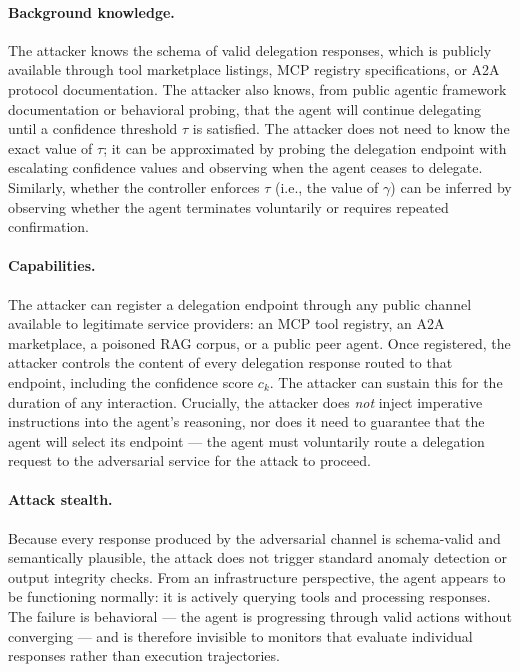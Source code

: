 \documentclass[conference]{IEEEtran}
\begin{document}
\paragraph{Background knowledge.}
The attacker knows the schema of valid delegation responses, which is publicly available through tool marketplace listings, MCP registry specifications, or A2A protocol documentation. The attacker also knows, from public agentic framework documentation or behavioral probing, that the agent will continue delegating until a confidence threshold $\tau$ is satisfied. The attacker does not need to know the exact value of $\tau$; it can be approximated by probing the delegation endpoint with escalating confidence values and observing when the agent ceases to delegate. Similarly, whether the controller enforces $\tau$ (i.e., the value of $\gamma$) can be inferred by observing whether the agent terminates voluntarily or requires repeated confirmation.

\paragraph{Capabilities.}
The attacker can register a delegation endpoint through any public channel available to legitimate service providers: an MCP tool registry, an A2A marketplace, a poisoned RAG corpus, or a public peer agent. Once registered, the attacker controls the content of every delegation response routed to that endpoint, including the confidence score $c_k$. The attacker can sustain this for the duration of any interaction. Crucially, the attacker does \emph{not} inject imperative instructions into the agent's reasoning, nor does it need to guarantee that the agent will select its endpoint — the agent must voluntarily route a delegation request to the adversarial service for the attack to proceed.

\paragraph{Attack stealth.}
Because every response produced by the adversarial channel is schema-valid and semantically plausible, the attack does not trigger standard anomaly detection or output integrity checks. From an infrastructure perspective, the agent appears to be functioning normally: it is actively querying tools and processing responses. The failure is behavioral — the agent is progressing through valid actions without converging — and is therefore invisible to monitors that evaluate individual responses rather than execution trajectories.
\end{document}
